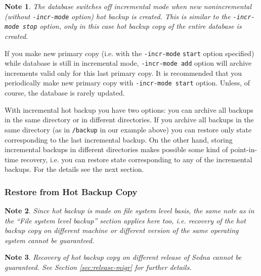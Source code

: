 \documentclass[a4paper,12pt]{article}
\newtheorem{note}{Note}    %
\begin{document}
\begin{note}
The database switches off incremental mode when new nonincremental (without
\verb!-incr-mode! option) hot backup is created. This is similar to the
\verb!-incr-mode stop! option, only in this case hot backup copy of the entire
database is created.
\end{note}

If you make new primary copy (i.e. with the \verb!-incr-mode! \verb!start!
option specified) while database is still in incremental mode,
\verb!-incr-mode add! option will archive increments valid only for this last
primary copy. It is recommended that you periodically make new primary copy with
\verb!-incr-mode start! option. Unless, of course, the database is rarely
updated.

With incremental hot backup you have two options: you can archive all backups in
the same directory or in different directories. If you archive all backups in
the same directory (as in \verb!/backup! in our example above) you can restore
only state corresponding to the last incremental backup. On the other hand,
storing incremental backups in different directories makes possible some kind of
point-in-time recovery, i.e. you can restore state corresponding to any of the
incremental backups. For the details see the next section.

\subsubsection*{Restore from Hot Backup Copy}

\begin{note}
Since hot backup is made on file system level basis, the same note as in the
``File system level backup'' section applies here too, i.e. recovery of the hot
backup copy on different machine or different version of the same operating
system cannot be guaranteed.
\end{note}

\begin{note}
Recovery of hot backup copy on different release of Sedna cannot be guaranteed.
See Section \ref{sec:release-migr} for further details.
\end{note}
\end{document}

